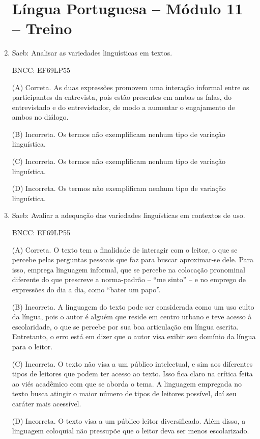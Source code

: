 \begin{enumerate}
\section*{Língua Portuguesa – Módulo 11 – Treino}

\item

Saeb: Analisar as variedades linguísticas em textos.

BNCC: EF69LP55

(A) Correta. As duas expressões promovem uma interação informal entre os
participantes da entrevista, pois estão presentes em ambas as falas, do
entrevistado e do entrevistador, de modo a aumentar o engajamento de
ambos no diálogo.

(B) Incorreta. Os termos não exemplificam nenhum tipo de variação
linguística.

(C) Incorreta. Os termos não exemplificam nenhum tipo de variação
linguística.

(D) Incorreta. Os termos não exemplificam nenhum tipo de variação
linguística.

\item

Saeb: Avaliar a adequação das variedades linguísticas em contextos de uso.

BNCC: EF69LP55

(A) Correta. O texto tem a finalidade de interagir com o leitor, o que
se percebe pelas perguntas pessoais que faz para buscar aproximar-se
dele. Para isso, emprega linguagem informal, que se percebe na colocação
pronominal diferente do que prescreve a norma-padrão -- ``me sinto'' --
e no emprego de expressões do dia a dia, como ``bater um papo''.

(B) Incorreta. A linguagem do texto pode ser considerada como um uso
culto da língua, pois o autor é alguém que reside em centro urbano e
teve acesso à escolaridade, o que se percebe por sua boa articulação em
língua escrita. Entretanto, o erro está em dizer que o autor visa exibir
seu domínio da língua para o leitor.

(C) Incorreta. O texto não visa a um público intelectual, e sim aos
diferentes tipos de leitores que podem ter acesso ao texto. Isso fica
claro na crítica feita ao viés acadêmico com que se aborda o tema. A
linguagem empregada no texto busca atingir o maior número de tipos de
leitores possível, daí seu caráter mais acessível.

(D) Incorreta. O texto visa a um público leitor diversificado. Além
disso, a linguagem coloquial não pressupõe que o leitor deva ser menos
escolarizado.


\end{enumerate}
